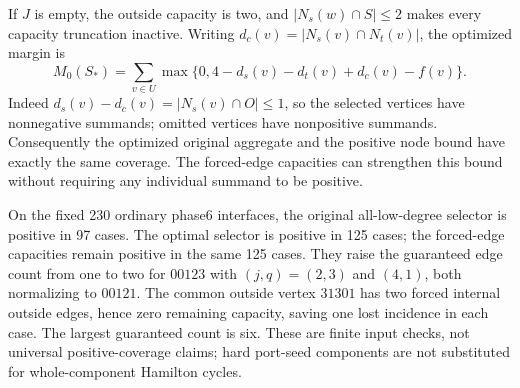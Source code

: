 If $J$ is empty, the outside capacity is two, and
$|N_s(w)\cap S|\le2$ makes every capacity truncation inactive.
Writing $d_c(v)=|N_s(v)\cap N_t(v)|$, the optimized margin is
\[
 M_0(S_*)=\sum_{v\in U}
   \max\{0,4-d_s(v)-d_t(v)+d_c(v)-f(v)\}.
\]
Indeed $d_s(v)-d_c(v)=|N_s(v)\cap O|\le1$, so the selected
vertices have nonnegative summands; omitted vertices have
nonpositive summands. Consequently the optimized original aggregate
and the positive node bound have exactly the same coverage.
The forced-edge capacities can strengthen this bound without
requiring any individual summand to be positive.

On the fixed 230 ordinary phase6 interfaces, the original all-low-degree
selector is positive in 97 cases. The optimal selector is positive in
125 cases; the forced-edge capacities remain positive in the same
125 cases. They raise the guaranteed edge count from one to two for
$00123$ with $(j,q)=(2,3)$ and $(4,1)$, both normalizing to $00121$.
The common outside vertex $31301$ has two forced internal outside
edges, hence zero remaining capacity, saving one lost incidence in
each case. The largest guaranteed count is six. These are finite
input checks, not universal positive-coverage claims; hard port-seed
components are not substituted for whole-component Hamilton cycles.
